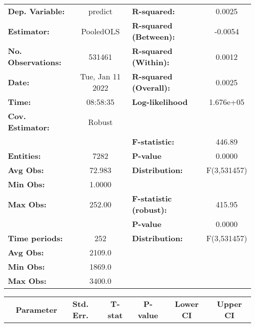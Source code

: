 \begin{center}
\begin{tabular}{lclc}
\toprule
\textbf{Dep. Variable:}    &      predict       & \textbf{  R-squared:         }   &      0.0025      \\
\textbf{Estimator:}        &     PooledOLS      & \textbf{  R-squared (Between):}  &     -0.0054      \\
\textbf{No. Observations:} &       531461       & \textbf{  R-squared (Within):}   &      0.0012      \\
\textbf{Date:}             &  Tue, Jan 11 2022  & \textbf{  R-squared (Overall):}  &      0.0025      \\
\textbf{Time:}             &      08:58:35      & \textbf{  Log-likelihood     }   &    1.676e+05     \\
\textbf{Cov. Estimator:}   &       Robust       & \textbf{                     }   &                  \\
\textbf{}                  &                    & \textbf{  F-statistic:       }   &      446.89      \\
\textbf{Entities:}         &        7282        & \textbf{  P-value            }   &      0.0000      \\
\textbf{Avg Obs:}          &       72.983       & \textbf{  Distribution:      }   &   F(3,531457)    \\
\textbf{Min Obs:}          &       1.0000       & \textbf{                     }   &                  \\
\textbf{Max Obs:}          &       252.00       & \textbf{  F-statistic (robust):} &      415.95      \\
\textbf{}                  &                    & \textbf{  P-value            }   &      0.0000      \\
\textbf{Time periods:}     &        252         & \textbf{  Distribution:      }   &   F(3,531457)    \\
\textbf{Avg Obs:}          &       2109.0       & \textbf{                     }   &                  \\
\textbf{Min Obs:}          &       1869.0       & \textbf{                     }   &                  \\
\textbf{Max Obs:}          &       3400.0       & \textbf{                     }   &                  \\
\bottomrule
\end{tabular}
\begin{tabular}{lcccccc}
                & \textbf{Parameter} & \textbf{Std. Err.} & \textbf{T-stat} & \textbf{P-value} & \textbf{Lower CI} & \textbf{Upper CI}  \\

\end{tabular}
\end{center}
